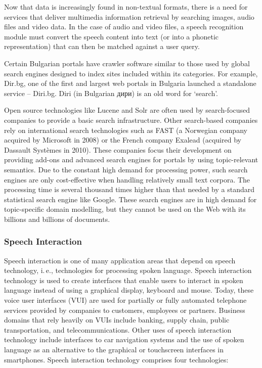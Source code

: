 \begin{multicols}{2}
  Now that data is increasingly found in non-textual formats, there is a need for services that deliver multimedia information retrieval by searching images, audio files and video data. In the case of audio and video files, a speech recognition module must convert the speech content into text (or into a phonetic representation) that can then be matched against a user query.

  Certain Bulgarian portals have crawler software similar to those used by global search engines designed to index sites included within its categories. For example, Dir.bg, one of the first and largest web portals in Bulgaria launched a standalone service – Diri.bg. Diri (in Bulgarian {дири}) is an old word for ‘search’. 

  Open source technologies like Lucene and Solr are often used by search-focused companies to provide a basic search infrastructure. Other search-based companies rely on international search technologies such as FAST (a Norwegian company acquired by Microsoft in 2008) or the French company Exalead (acquired by Dassault Systèmes in 2010). These companies focus their development on providing add-ons and advanced search engines for portals by using topic-relevant semantics. Due to the constant high demand for processing power, such search engines are only cost-effective when handling relatively small text corpora. The processing time is several thousand times higher than that needed by a standard statistical search engine like Google. These search engines are in high demand for topic-specific domain modelling, but they cannot be used on the Web with its billions and billions of documents.

  \subsubsection{Speech Interaction}

  Speech interaction is one of many application areas that depend on speech technology, i.\,e., technologies for processing spoken language. Speech interaction technology is used to create interfaces that enable users to interact in spoken language instead of using a graphical display, keyboard and mouse.  Today, these voice user interfaces (VUI) are used for partially or fully automated telephone services provided by companies to customers, employees or partners. Business domains that rely heavily on VUIs include banking, supply chain, public transportation, and telecommunications. Other uses of speech interaction technology include interfaces to car navigation systems and the use of spoken language as an alternative to the graphical or touchscreen interfaces in smartphones. Speech interaction technology comprises four technologies: 


\end{multicols}
